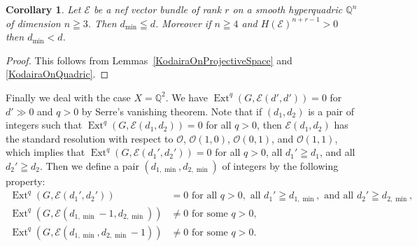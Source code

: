 \documentclass[a4paper,12pt]{amsart}
\newtheorem{cor}[thm]{Corollary}%
\DeclareMathOperator{\Ext}{Ext}
\begin{document}
\begin{cor}\label{quadricResol3}
Let $\mathcal{E}$ be a nef vector bundle of rank $r$ on a smooth hyperquadric $\mathbb{Q}^n$
of dimension $n\geqq 3$.
Then $d_{\min}\leqq d$.
Moreover if $n\geqq 4$ and $H(\mathcal{E})^{n+r-1}>0$ then $d_{\min}< d$.
\end{cor}
\begin{proof}
This follows from Lemmas~\ref{KodairaOnProjectiveSpace} and \ref{KodairaOnQuadric}.
\end{proof}

Finally we deal with the case $X=\mathbb{Q}^2$.
We have $\Ext^q(G,\mathcal{E}(d',d'))=0$ for $d'\gg 0$ and $q>0$ 
by Serre's vanishing theorem.
Note that if $(d_1,d_2)$ is a pair of integers such that $\Ext^q(G,\mathcal{E}(d_1,d_2))=0$ for all $q>0$,
then $\mathcal{E}(d_1,d_2)$ has the standard resolution with respect to $\mathcal{O}$, $\mathcal{O}(1,0)$,
$\mathcal{O}(0,1)$, and $\mathcal{O}(1,1)$, which implies that $\Ext^q(G,\mathcal{E}(d_1',d_2'))=0$ for all $q>0$,
all $d_1'\geqq d_1$, and all $d_2'\geqq d_2$.
Then we define a pair $(d_{1,\min},d_{2,\min})$ of integers
by the following property:
\[
\begin{split}
\Ext^q(G,\mathcal{E}(d_1',d_2'))&=0\textrm{ for all }q>0,\textrm{ all }d_1'\geqq d_{1,\min},\textrm{ and all }d_2'\geqq d_{2,\min},\\
\Ext^q(G,\mathcal{E}(d_{1,\min}-1,d_{2,\min}))&\neq 0\textrm{ for some }q>0,\\
\Ext^q(G,\mathcal{E}(d_{1,\min},d_{2,\min}-1))&\neq 0\textrm{ for some }q>0.
\end{split}
\]
\end{document}
